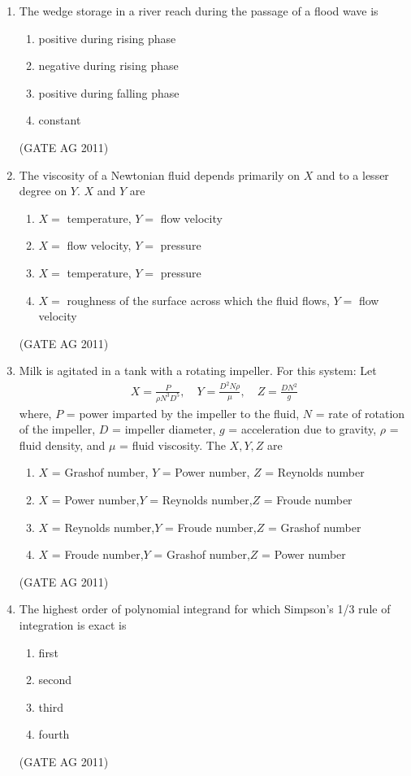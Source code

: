 \documentclass[journal,12pt,onecolumn]{IEEEtran}
\theoremstyle{remark}
\begin{document}
\begin{enumerate}
\item The wedge storage in a river reach during the passage of a flood wave is
\begin{enumerate}
\item positive during rising phase
\item negative during rising phase
\item positive during falling phase
\item constant
\end{enumerate}
\hfill{(GATE AG 2011)}

\item The viscosity of a Newtonian fluid depends primarily on $X$ and to a lesser degree on $Y$.  
$X$ and $Y$ are
\begin{enumerate}
\item $X =$ temperature, $Y =$ flow velocity
\item $X =$ flow velocity, $Y =$ pressure
\item $X =$ temperature, $Y =$ pressure
\item $X =$ roughness of the surface across which the fluid flows, $Y =$ flow velocity
\end{enumerate}
\hfill{(GATE AG 2011)}

\item Milk is agitated in a tank with a rotating impeller. For this system: 
Let 
\begin{align*}
X = \frac{P}{\rho N^3 D^5}, \quad Y = \frac{D^2 N \rho}{\mu}, \quad Z = \frac{DN^2}{g} 
\end{align*}
where, $P$ = power imparted by the impeller to the fluid, $N$ = rate of rotation of the impeller, 
$D$ = impeller diameter, $g$ = acceleration due to gravity, $\rho$ = fluid density, and $\mu$ = fluid viscosity. 
The $X, Y, Z$ are
\begin{enumerate}
\item $X$ = Grashof number, $Y$ = Power number, $Z$ = Reynolds number  
\item $X$ = Power number,$Y$ = Reynolds number,$Z$ = Froude number 
\item $X$ = Reynolds number,$Y$ = Froude number,$Z$ = Grashof number 
\item $X$ = Froude number,$Y$ = Grashof number,$Z$ = Power number
\end{enumerate}
\hfill{(GATE AG 2011)}

\item The highest order of polynomial integrand for which Simpson's 1/3 rule of integration is exact is
\begin{multicols}{4}
\begin{enumerate}
\item first 
\item second  
\item third 
\item fourth
\end{enumerate}
\end{multicols}
\hfill{(GATE AG 2011)}


\end{enumerate}
\end{document}
